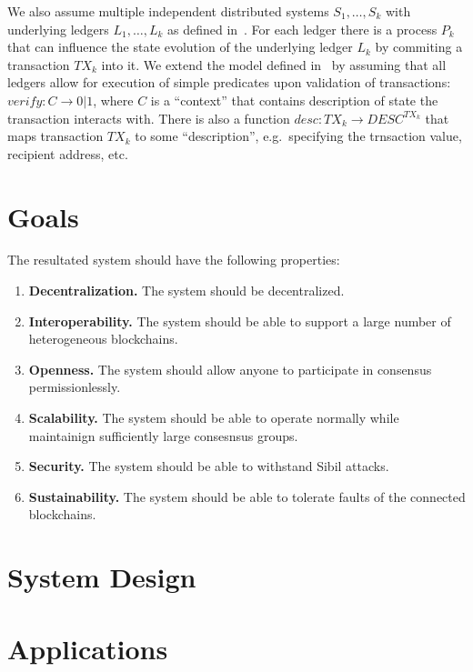 \documentclass{article}
\begin{document}
    We also assume multiple independent distributed systems $S_1, \dots, S_k$ with underlying ledgers $L_1, \dots, L_k$ as defined in~\cite{cryptoeprint:2019/1128}.
    For each ledger there is a process $P_k$ that can influence the state evolution of the underlying ledger $L_k$ by commiting a transaction $TX_k$ into it.
    We extend the model defined in~\cite{cryptoeprint:2019/1128} by assuming that all ledgers allow for execution of simple predicates upon validation of transactions:
    $verify: C \rightarrow 0 | 1$, where $C$ is a \enquote{context} that contains description of state the transaction interacts with.
    There is also a function $desc: TX_k \rightarrow DESC^{TX_k}$ that maps transaction $TX_k$ to some \enquote{description}, e.g.\ specifying the trnsaction value, recipient address, etc.


    \section{Goals}\label{sec:goals}

    The resultated system should have the following properties:
    \begin{enumerate}
        \item \textbf{Decentralization.} The system should be decentralized.
        \item \textbf{Interoperability.} The system should be able to support a large number of heterogeneous blockchains.
        \item \textbf{Openness.} The system should allow anyone to participate in consensus permissionlessly.
        \item \textbf{Scalability.} The system should be able to operate normally while maintainign sufficiently large consesnsus groups.
        \item \textbf{Security.} The system should be able to withstand Sibil attacks.
        \item \textbf{Sustainability.} The system should be able to tolerate faults of the connected blockchains.
    \end{enumerate}


    \section{System Design}\label{sec:system-design}
    


    \section{Applications}\label{sec:applications}
\end{document}
